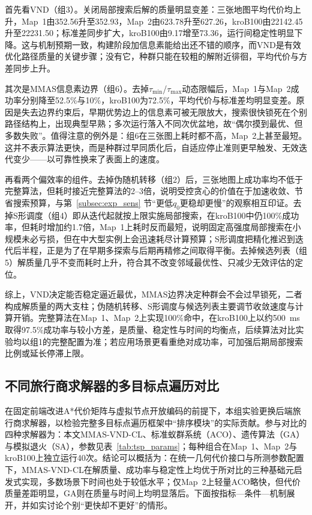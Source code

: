 \documentclass[lettersize,journal]{IEEEtran}
\begin{document}
首先看VND（组3）。关闭局部搜索后解的质量明显变差：三张地图平均代价均上升，Map~1由352.56升至352.93，Map~2由623.78升至627.26，kroB100由22142.45升至22231.50；标准差同步扩大，kroB100由9.17增至73.36，运行间稳定性明显下降。这与机制预期一致，构建阶段加信息素能给出还不错的顺序，而VND是有效优化路径质量的关键步骤；没有它，种群只能在较粗的解附近徘徊，平均代价与方差同步上升。

其次是MMAS信息素边界（组6）。去掉$\tau_{\min}$/$\tau_{\max}$动态限幅后，Map~1与Map~2成功率分别降至52.5\%与10\%，kroB100为72.5\%，平均代价与标准差均明显变差。原因是失去边界约束后，早期优势边上的信息素可被无限放大，搜索很快锁死在个别路径结构上，出现典型早熟；多次运行落入不同次优盆地，故“偶尔摸到最优、但多数失败”。值得注意的例外是：组6在三张图上耗时都不高，Map~2上甚至最短。这并不表示算法更快，而是种群过早同质化后，自适应停止准则更早触发、无效迭代变少——以可靠性换来了表面上的速度。

再看两个偏效率的组件。去掉伪随机转移（组2）后，三张地图上成功率均不低于完整算法，但耗时接近完整算法的2--3倍，说明受控贪心的价值在于加速收敛、节省搜索预算，与第~\textcolor{blue}{\ref{subsec:exp_sens}} 节“更低$q_0$更稳却更慢”的观察相互印证。去掉S形调度（组4）即从迭代起就按上限实施局部搜索，在kroB100中仍100\%成功率，但耗时增加约1.7倍，Map~1上耗时反而最短，说明固定高强度局部搜索在小规模未必亏损，但在中大型实例上会迅速耗尽计算预算；S形调度把精化推迟到迭代后半程，正是为了在早期多探索与后期再精修之间取得平衡。去掉候选列表（组5）解质量几乎不变而耗时上升，符合其不改变邻域最优性、只减少无效评估的定位。

综上，VND决定能否稳定逼近最优，MMAS边界决定种群会不会过早锁死，二者构成解质量的两大支柱；伪随机转移、S形调度与候选列表主要调节收敛速度与计算开销。完整算法在Map~1、Map~2上实现100\%命中，在kroB100上以约500~ms取得97.5\%成功率与较小方差，是质量、稳定性与时间的均衡点，后续算法对比实验均以组1的完整配置为准；若应用场景更看重绝对成功率，可加强后期局部搜索比例或延长停滞上限。


\subsection{不同旅行商求解器的多目标点遍历对比}
\label{subsec:exp_cmp}

在固定前端改进A*代价矩阵与虚拟节点开放编码的前提下，本组实验更换后端旅行商求解器，以检验完整多目标点遍历框架中“排序模块”的实际贡献。参与对比的四种求解器为：本文MMAS-VND-CL、标准蚁群系统（ACO）、遗传算法（GA）与模拟退火（SA），参数见表~\textcolor{blue}{\ref{tab:tsp_params}}；每种组合在Map~1、Map~2与kroB100上独立运行40次。结论可以概括为：在统一几何代价接口与所测参数配置下，MMAS-VND-CL在解质量、成功率与稳定性上均优于所对比的三种基础元启发式实现，多数场景下时间也处于较低水平；仅Map~2上轻量ACO略快，但代价质量差距明显，GA则在质量与时间上均明显落后。下面按指标—条件—机制展开，并如实讨论个别“更快却不更好”的情形。
\end{document}
